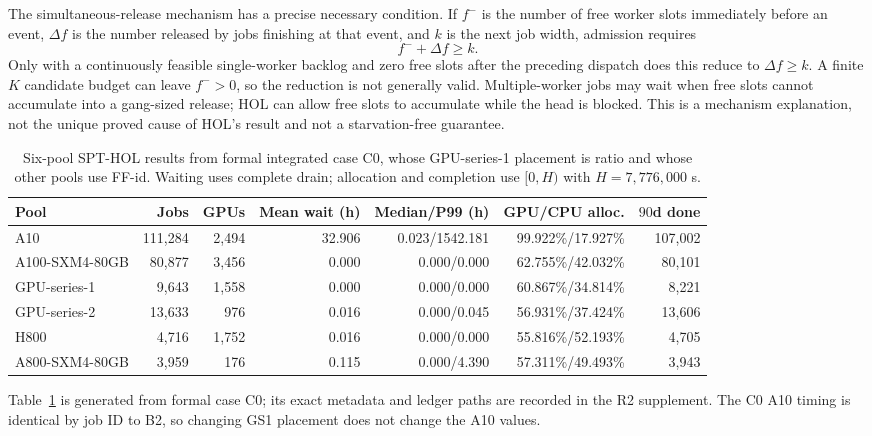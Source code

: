 The simultaneous-release mechanism has a precise necessary condition. If $f^-$ is the number of free worker slots immediately before an event, $\Delta f$ is the number released by jobs finishing at that event, and $k$ is the next job width, admission requires
\begin{equation}
 f^-+\Delta f\ge k.
\end{equation}
Only with a continuously feasible single-worker backlog and zero free slots after the preceding dispatch does this reduce to $\Delta f\ge k$. A finite $K$ candidate budget can leave $f^->0$, so the reduction is not generally valid. Multiple-worker jobs may wait when free slots cannot accumulate into a gang-sized release; HOL can allow free slots to accumulate while the head is blocked. This is a mechanism explanation, not the unique proved cause of HOL's result and not a starvation-free guarantee.

\begin{table}[H]\centering
\caption{Six-pool SPT-HOL results from formal integrated case C0, whose GPU-series-1 placement is ratio and whose other pools use FF-id. Waiting uses complete drain; allocation and completion use $[0,H)$ with $H=7,776,000$ s.}
\label{tab:r2pools}
\begin{tabular}{lrrrrrr}
\toprule
Pool & Jobs & GPUs & Mean wait (h) & Median/P99 (h) & GPU/CPU alloc. & $90$d done\\
\midrule
A10 &111,284&2,494&32.906&0.023/1542.181&99.922\%/17.927\%&107,002\\
A100-SXM4-80GB&80,877&3,456&0.000&0.000/0.000&62.755\%/42.032\%&80,101\\
GPU-series-1&9,643&1,558&0.000&0.000/0.000&60.867\%/34.814\%&8,221\\
GPU-series-2&13,633&976&0.016&0.000/0.045&56.931\%/37.424\%&13,606\\
H800&4,716&1,752&0.016&0.000/0.000&55.816\%/52.193\%&4,705\\
A800-SXM4-80GB&3,959&176&0.115&0.000/4.390&57.311\%/49.493\%&3,943\\
\bottomrule
\end{tabular}
\end{table}

Table~\ref{tab:r2pools} is generated from formal case C0; its exact metadata and ledger paths are recorded in the R2 supplement. The C0 A10 timing is identical by job ID to B2, so changing GS1 placement does not change the A10 values.

